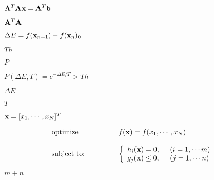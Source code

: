 \documentclass{article}
\def\lthtmlcheckvsize{\ifdim\ht\sizebox<\vsize 
  \ifdim\wd\sizebox<\hsize\expandafter\hfill\fi \expandafter\vfill
  \else\expandafter\vss\fi}%
\begin{document}
{\newpage\clearpage
{}%
$\displaystyle {\bf A}^T{\bf A}{\bf x}={\bf A}^T{\bf b}$%
\lthtmlindisplaymathZ
\lthtmlcheckvsize\clearpage}

{\newpage\clearpage
{}%
$ {\bf A}^T{\bf A}$%
\lthtmlindisplaymathZ
\lthtmlcheckvsize\clearpage}

{\newpage\clearpage
{}%
$ \Delta E=f({\bf x}_{n+1})-f({\bf x}_n)_0$%
\lthtmlindisplaymathZ
\lthtmlcheckvsize\clearpage}

{\newpage\clearpage
{}%
$ Th$%
\lthtmlindisplaymathZ
\lthtmlcheckvsize\clearpage}

{\newpage\clearpage
{}%
$ P$%
\lthtmlindisplaymathZ
\lthtmlcheckvsize\clearpage}

{\newpage\clearpage
{}%
$\displaystyle P(\Delta E, T)=e^{-\Delta E/T}  > Th$%
\lthtmlindisplaymathZ
\lthtmlcheckvsize\clearpage}

{\newpage\clearpage
{}%
$ \Delta E$%
\lthtmlindisplaymathZ
\lthtmlcheckvsize\clearpage}

{\newpage\clearpage
{}%
$ T$%
\lthtmlindisplaymathZ
\lthtmlcheckvsize\clearpage}

{\newpage\clearpage
{}%
$ {\bf x}=[x_1,\cdots,x_N]^T$%
\lthtmlindisplaymathZ
\lthtmlcheckvsize\clearpage}

{\newpage\clearpage
{}%
\begin{displaymath}\begin{array}{ll}
\mbox{optimize} & f({\bf x})=f(x_1,\cdots,x_N) \\
\;\;\;\;\;\;\;\;\;\;\;\;\;\;\;\;\;\;\;\;\;\;\;\;\;\;\;\;\;\;\\
\mbox{subject to:} &
\left\{ \begin{array}{l}
h_i({\bf x})=0,\;\;\;\;\;(i=1,\cdots m)\\
g_j({\bf x})\le 0,\;\;\;\;\;(j=1,\cdots n)
\end{array} \right.
\end{array}\end{displaymath}%
\lthtmldisplayZ
\lthtmlcheckvsize\clearpage}

{\newpage\clearpage
{}%
$ m+n$%
\lthtmlindisplaymathZ
\lthtmlcheckvsize\clearpage}
\end{document}
